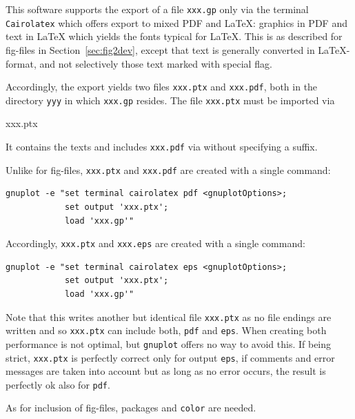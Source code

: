 This software supports the export of a file \texttt{xxx.gp} 
only via the terminal \texttt{Cairolatex} 
which offers export to mixed PDF and \LaTeX\@: 
graphics in PDF and text in \LaTeX{}
which yields the fonts typical for \LaTeX. 
This is as described for fig-files in Section~\ref{sec:fig2dev}, 
except that text is generally converted in \LaTeX{}-format, 
and not selectively those text marked with special flag. 

Accordingly, the export yields two files \texttt{xxx.ptx} and
\texttt{xxx.pdf}, both in the directory \texttt{yyy} 
in which \texttt{xxx.gp} resides. 
The file \texttt{xxx.ptx} must be imported via 
%
\begin{taglstlisting}[language=TeX]
{xxx.ptx}
\end{taglstlisting}
%
It contains the texts and includes \texttt{xxx.pdf} 
via  without specifying a suffix. 

Unlike for fig-files, 
\texttt{xxx.ptx} and \texttt{xxx.pdf} are created with a single command: 
%
\begin{verbatim}
gnuplot -e "set terminal cairolatex pdf <gnuplotOptions>;
            set output 'xxx.ptx';
            load 'xxx.gp'"
\end{verbatim}

Accordingly, 
\texttt{xxx.ptx} and \texttt{xxx.eps} are created with a single command: 
%
\begin{verbatim}
gnuplot -e "set terminal cairolatex eps <gnuplotOptions>;
            set output 'xxx.ptx';
            load 'xxx.gp'"
\end{verbatim}
%
Note that this writes another but identical file \texttt{xxx.ptx} 
as no file endings are written 
and so \texttt{xxx.ptx} can include both, \texttt{pdf} and \texttt{eps}. 
When creating both performance is not optimal, 
but \texttt{gnuplot} offers no way to avoid this. 
If being strict, 
\texttt{xxx.ptx} is perfectly correct only for output \texttt{eps},
if comments and error messages are taken into account 
but as long as no error occurs, 
the result is perfectly ok also for \texttt{pdf}. 

As for inclusion of fig-files, 
packages  and \texttt{color} are needed. 



